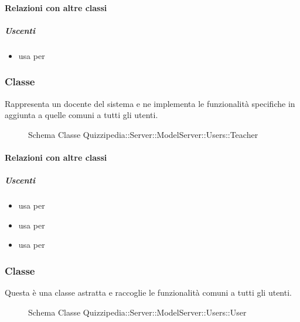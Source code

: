 \paragraph{Relazioni con altre classi}
\subparagraph{Uscenti}
\begin{itemize}
\item usa  per 
\end{itemize}
\subsubsection{Classe }
Rappresenta un docente del sistema e ne implementa le funzionalità specifiche in aggiunta a quelle comuni a tutti gli utenti.
\begin{figure}[H]
\centering
\noindent{}
\caption[Schema Classe Teacher]{Schema Classe Quizzipedia::Server::ModelServer::Users::Teacher}
\end{figure}
\paragraph{Relazioni con altre classi}
\subparagraph{Uscenti}
\begin{itemize}
\item usa  per 
\item usa  per 
\item usa  per 
\end{itemize}
\subsubsection{Classe }
Questa è una classe astratta e raccoglie le funzionalità comuni a tutti gli utenti.
\begin{figure}[H]
\centering
\noindent{}
\caption[Schema Classe User]{Schema Classe Quizzipedia::Server::ModelServer::Users::User}
\end{figure}
